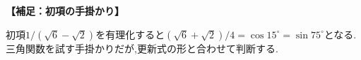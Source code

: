   \medskip
  \noindent \textbf{【補足：初項の手掛かり】}

  初項$1/(\sqrt6-\sqrt2)$を有理化すると$(\sqrt6+\sqrt2)/4=\cos15^\circ=\sin75^\circ$となる.
  三角関数を試す手掛かりだが,更新式の形と合わせて判断する.
  \par
  \endgroup


